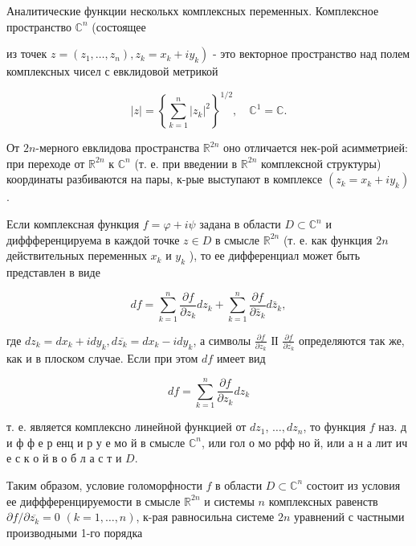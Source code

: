 \documentclass[10pt]{article}
\begin{document}
Аналитические функции несколькх комплексных переменных. Комплексное пространство $\mathbb{C}^{n}$ (состоящее

из точек $\left.z=\left(z_{1}, \ldots, z_{n}\right), z_{k}=x_{k}+i y_{k}\right)$ - это векторное пространство над полем комплексных чисел с евклидовой метрикой



\[

|z|=\left\{\sum_{k=1}^{n}\left|z_{k}\right|^{2}\right\}^{1 / 2}, \quad \mathbb{C}^{1}=\mathbb{C} .

\]



От $2 n$-мерного евклидова пространства $\mathbb{R}^{2 n}$ оно отличается нек-рой асимметрией: при переходе от $\mathbb{R}^{2 n}$ к $\mathbb{C}^{n}$ (т. е. при введении в $\mathbb{R}^{2 n}$ комплексной структуры) координаты разбиваются на пары, к-рые выступают в комплексе $\left(z_{k}=x_{k}+i y_{k}\right)$.



Если комплексная функция $f=\varphi+i \psi$ задана в области $D \subset \mathbb{C}^{n}$ и диффференцируема в каждой точке $z \in D$ в смысле $\mathbb{R}^{2 n}$ (т. е. как функция $2 n$ действительных переменных $x_{k}$ и $y_{k}$ ), то ее дифференциал может быть представлен в виде



\[

d f=\sum_{k=1}^{n} \frac{\partial f}{\partial z_{k}} d z_{k}+\sum_{k=1}^{n} \frac{\partial f}{\partial \bar{z}_{k}} d \bar{z}_{k},

\]



где $d z_{k}=d x_{k}+i d y_{k}, d \overline{z_{k}}=d x_{k}-i d y_{k}$, а символы $\frac{\partial f}{\partial z_{k}}$ ІІ $\frac{\partial f}{\partial \overline{z_{k}}}$ определяются так же, как и в плоском случае. Если при этом $d f$ имеет вид



\[

d f=\sum_{k=1}^{n} \frac{\partial f}{\partial z_{k}} d z_{k}

\]



т. е. является комплексно линейной функцией от $d z_{1}$, $\ldots, d z_{n}$, то функция $f$ наз. д и ф ф е р енц и р у е мо й в смысле $\mathbb{C}^{n}$, или гол о мо рфф но й, или а н а лит ич е с к о й в о б л а с т и $D$.



Таким образом, условие голоморфности $f$ в области $D \subset \mathbb{C}^{n}$ состоит из условия ее диффференцируемости в смысле $\mathbb{R}^{2 n}$ и системы $n$ комплексных равенств $\partial f / \partial \overline{z_{k}}=0$ $(k=1, \ldots, n)$, к-рая равносильна системе $2 n$ уравнений с частными производными 1-го порядка
\end{document}
